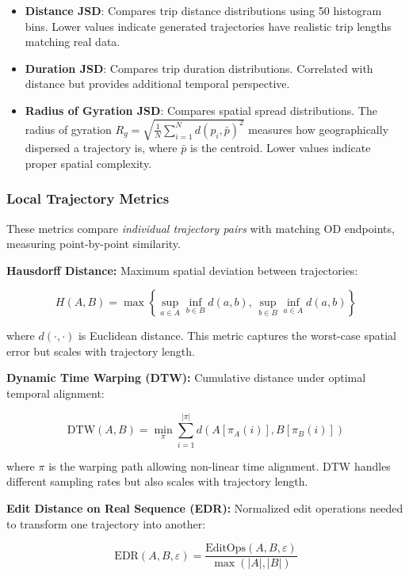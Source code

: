 \begin{itemize}[noitemsep,topsep=0pt]
\item \textbf{Distance JSD}: Compares trip distance distributions using 50 histogram bins. Lower values indicate generated trajectories have realistic trip lengths matching real data.
\item \textbf{Duration JSD}: Compares trip duration distributions. Correlated with distance but provides additional temporal perspective.
\item \textbf{Radius of Gyration JSD}: Compares spatial spread distributions. The radius of gyration $R_g = \sqrt{\frac{1}{N} \sum_{i=1}^{N} d(p_i, \bar{p})^2}$ measures how geographically dispersed a trajectory is, where $\bar{p}$ is the centroid. Lower values indicate proper spatial complexity.
\end{itemize}

\subsubsection{Local Trajectory Metrics}

These metrics compare \emph{individual trajectory pairs} with matching OD endpoints, measuring point-by-point similarity.

\textbf{Hausdorff Distance:} Maximum spatial deviation between trajectories:

\begin{equation}
H(A, B) = \max \left\{ \sup_{a \in A} \inf_{b \in B} d(a, b), \, \sup_{b \in B} \inf_{a \in A} d(a, b) \right\}
\end{equation}

where $d(\cdot, \cdot)$ is Euclidean distance. This metric captures the worst-case spatial error but scales with trajectory length.

\textbf{Dynamic Time Warping (DTW):} Cumulative distance under optimal temporal alignment:

\begin{equation}
\text{DTW}(A, B) = \min_{\pi} \sum_{i=1}^{|\pi|} d(A[\pi_A(i)], B[\pi_B(i)])
\end{equation}

where $\pi$ is the warping path allowing non-linear time alignment. DTW handles different sampling rates but also scales with trajectory length.

\textbf{Edit Distance on Real Sequence (EDR):} Normalized edit operations needed to transform one trajectory into another:

\begin{equation}
\text{EDR}(A, B, \varepsilon) = \frac{\text{EditOps}(A, B, \varepsilon)}{\max(|A|, |B|)}
\end{equation}

